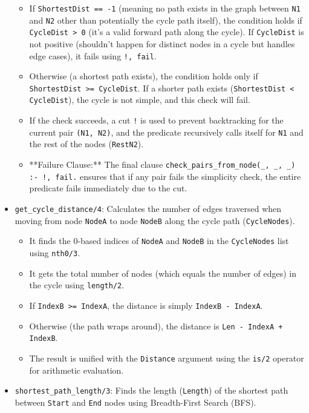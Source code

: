 \documentclass[12pt,a4paper]{article}
\begin{document}
\begin{itemize}
\begin{itemize}
                    \item If \texttt{ShortestDist == -1} (meaning no path exists in the graph between \texttt{N1} and \texttt{N2} other than potentially the cycle path itself), the condition holds if \texttt{CycleDist > 0} (it's a valid forward path along the cycle). If \texttt{CycleDist} is not positive (shouldn't happen for distinct nodes in a cycle but handles edge cases), it fails using \texttt{!, fail}.
                    \item Otherwise (a shortest path exists), the condition holds only if \texttt{ShortestDist >= CycleDist}. If a shorter path exists (\texttt{ShortestDist < CycleDist}), the cycle is not simple, and this check will fail.
                \item If the check succeeds, a cut \texttt{!} is used to prevent backtracking for the current pair \texttt{(N1, N2)}, and the predicate recursively calls itself for \texttt{N1} and the rest of the nodes (\texttt{RestN2}).
            \item **Failure Clause:** The final clause \texttt{check\_pairs\_from\_node(\_, \_, \_) :- !, fail.} ensures that if any pair fails the simplicity check, the entire predicate fails immediately due to the cut.
        \end{itemize}
    \item \texttt{get\_cycle\_distance/4}: Calculates the number of edges traversed when moving from node \texttt{NodeA} to node \texttt{NodeB} along the cycle path (\texttt{CycleNodes}).
        \begin{itemize}
            \item It finds the 0-based indices of \texttt{NodeA} and \texttt{NodeB} in the \texttt{CycleNodes} list using \texttt{nth0/3}.
            \item It gets the total number of nodes (which equals the number of edges) in the cycle using \texttt{length/2}.
            \item If \texttt{IndexB >= IndexA}, the distance is simply \texttt{IndexB - IndexA}.
            \item Otherwise (the path wraps around), the distance is \texttt{Len - IndexA + IndexB}.
            \item The result is unified with the \texttt{Distance} argument using the \texttt{is/2} operator for arithmetic evaluation.
        \end{itemize}
    \item \texttt{shortest\_path\_length/3}: Finds the length (\texttt{Length}) of the shortest path between \texttt{Start} and \texttt{End} nodes using Breadth-First Search (BFS).

\end{itemize}
\end{document}
